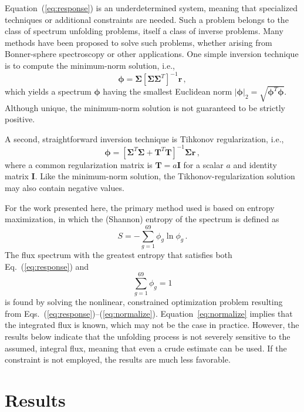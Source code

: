 \documentclass[journal]{IEEEtran}
\newcommand{\EQ}[1]{Eq.~(\ref{#1})}               %
\newcommand{\EQUATION}[1]{Equation~(\ref{#1})}    %
\begin{document}
\EQUATION{eq:response} is an underdetermined system, meaning that specialized techniques or additional constraints are needed.  Such a problem belongs to the class of  spectrum unfolding problems, itself a class of inverse problems.  Many methods have been proposed to solve such problems, whether arising from Bonner-sphere spectroscopy or other applications.  One simple inversion technique is to compute the minimum-norm solution, i.e.,
\begin{equation}
  \bm{\phi} =  \bm{\Sigma}  [\bm{\Sigma} \bm{\Sigma}^T]^{-1}\mathbf{r} \, ,
\end{equation}
which yields a spectrum $\bm{\phi}$ having the smallest Euclidean norm $|\bm{\phi}|_2 = \sqrt{\bm{\phi}^T\bm{\phi}}$.  Although unique, the minimum-norm solution is not guaranteed to be strictly positive.  

A second, straightforward inversion technique is Tihkonov regularization\cite{mueller2012lni}, i.e.,
\begin{equation}
 \bm{\phi} = [\bm{\Sigma}^T \bm{\Sigma}+ \mathbf{T}^T \mathbf{T}]^{-1} \bm{\Sigma} \mathbf{r} \, ,
\end{equation}
where a common regularization matrix is $\mathbf{T} = a\mathbf{I}$ for a scalar $a$ and identity matrix $\mathbf{I}$.  Like the minimum-norm solution, the Tikhonov-regularization solution may also contain negative values.

For the work presented here, the primary method used is based on entropy maximization\cite{itoh1989neutron}, in which the (Shannon) entropy of the spectrum is defined as
\begin{equation}
 S = -\sum^{69}_{g=1} \phi_g \ln \phi_g \, .
\label{eq:entropy}
\end{equation}
The flux spectrum with the greatest entropy that satisfies both \EQ{eq:response} and
\begin{equation}
 \sum^{69}_{g=1} \phi_g = 1
\label{eq:normalize}
\end{equation}
is found by solving the nonlinear, constrained optimization problem resulting from Eqs.~(\ref{eq:response})--(\ref{eq:normalize}).  Equation~\ref{eq:normalize} implies that the integrated flux is known, which may not be the case in practice.  However, the results below indicate that the unfolding process is not severely sensitive to the assumed, integral flux, meaning that even a crude estimate can be used.  If the constraint is not employed, the results are much less favorable.


\section{Results}
\end{document}
